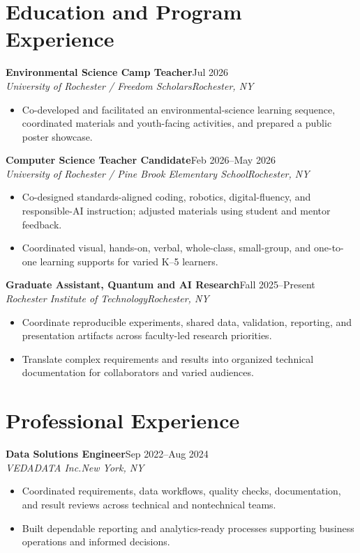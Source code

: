 \documentclass[10pt,letterpaper]{article}
\newcommand{\role}[4]{\textbf{#1}\hfill #2\\\textit{#3}\hfill\textit{#4}\vspace{-3pt}}
\begin{document}
\section*{Education and Program Experience}
\role{Environmental Science Camp Teacher}{Jul 2026}{University of Rochester / Freedom Scholars}{Rochester, NY}
\begin{itemize}
\item Co-developed and facilitated an environmental-science learning sequence,
coordinated materials and youth-facing activities, and prepared a public poster showcase.
\end{itemize}

\role{Computer Science Teacher Candidate}{Feb 2026--May 2026}{University of Rochester / Pine Brook Elementary School}{Rochester, NY}
\begin{itemize}
\item Co-designed standards-aligned coding, robotics, digital-fluency, and
responsible-AI instruction; adjusted materials using student and mentor feedback.
\item Coordinated visual, hands-on, verbal, whole-class, small-group, and
one-to-one learning supports for varied K--5 learners.
\end{itemize}

\role{Graduate Assistant, Quantum and AI Research}{Fall 2025--Present}{Rochester Institute of Technology}{Rochester, NY}
\begin{itemize}
\item Coordinate reproducible experiments, shared data, validation, reporting,
and presentation artifacts across faculty-led research priorities.
\item Translate complex requirements and results into organized technical
documentation for collaborators and varied audiences.
\end{itemize}

\section*{Professional Experience}
\role{Data Solutions Engineer}{Sep 2022--Aug 2024}{VEDADATA Inc.}{New York, NY}
\begin{itemize}
\item Coordinated requirements, data workflows, quality checks, documentation,
and result reviews across technical and nontechnical teams.
\item Built dependable reporting and analytics-ready processes supporting
business operations and informed decisions.
\end{itemize}
\end{document}
